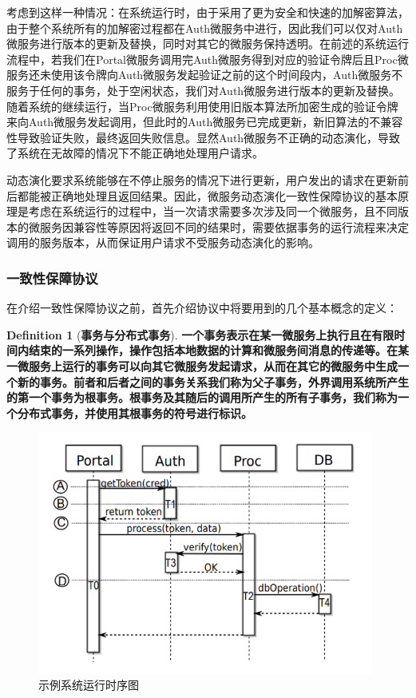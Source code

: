 \documentclass[a4paper]{article}
\theoremstyle{definition}
\newtheorem{definition}{Definition}[section]
\begin{document}
考虑到这样一种情况：在系统运行时，由于采用了更为安全和快速的加解密算法，由于整个系统所有的加解密过程都在Auth微服务中进行，因此我们可以仅对Auth微服务进行版本的更新及替换，同时对其它的微服务保持透明。在前述的系统运行流程中，若我们在Portal微服务调用完Auth微服务得到对应的验证令牌后且Proc微服务还未使用该令牌向Auth微服务发起验证之前的这个时间段内，Auth微服务不服务于任何的事务，处于空闲状态，我们对Auth微服务进行版本的更新及替换。随着系统的继续运行，当Proc微服务利用使用旧版本算法所加密生成的验证令牌来向Auth微服务发起调用，但此时的Auth微服务已完成更新，新旧算法的不兼容性导致验证失败，最终返回失败信息。显然Auth微服务不正确的动态演化，导致了系统在无故障的情况下不能正确地处理用户请求。

动态演化要求系统能够在不停止服务的情况下进行更新，用户发出的请求在更新前后都能被正确地处理且返回结果。因此，微服务动态演化一致性保障协议的基本原理是考虑在系统运行的过程中，当一次请求需要多次涉及同一个微服务，且不同版本的微服务因兼容性等原因将返回不同的结果时，需要依据事务的运行流程来决定调用的服务版本，从而保证用户请求不受服务动态演化的影响。

\subsubsection{一致性保障协议}
在介绍一致性保障协议之前，首先介绍协议中将要用到的几个基本概念的定义：

\theoremstyle{definition}
\begin{definition}[\textbf{事务与分布式事务}]
\label{definition:transaction}
\textbf{一个事务表示在某一微服务上执行且在有限时间内结束的一系列操作，操作包括本地数据的计算和微服务间消息的传递等。在某一微服务上运行的事务可以向其它微服务发起请求，从而在其它的微服务中生成一个新的事务。前者和后者之间的事务关系我们称为父子事务，外界调用系统所产生的第一个事务为根事务。根事务及其随后的调用所产生的所有子事务，我们称为一个分布式事务，并使用其根事务的符号进行标识。}
\end{definition}

\begin{figure}[ht]
 \centering
 \includegraphics[height=8cm]{images/ExampleProcess.png}
 \caption{示例系统运行时序图}
 \label{fig:ExampleProcess}
\end{figure}
\end{document}
